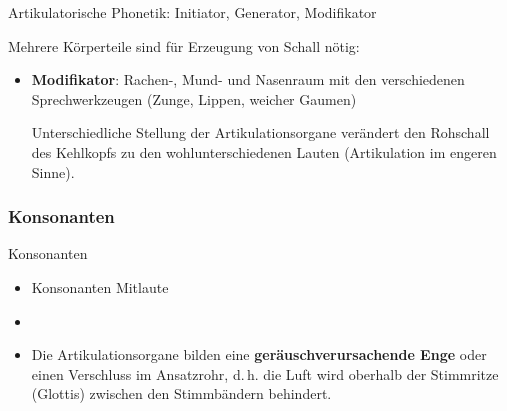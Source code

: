 
\begin{frame}{Artikulatorische Phonetik: Initiator, Generator, Modifikator}

Mehrere Körperteile sind für Erzeugung von Schall nötig:

	\begin{itemize}
		\item \textbf{Modifikator}: Rachen-, Mund- und Nasenraum mit den verschiedenen Sprechwerkzeugen (Zunge, Lippen, weicher Gaumen) \ras
		
		Unterschiedliche Stellung der Artikulationsorgane verändert den Rohschall des Kehlkopfs zu den wohlunterschiedenen Lauten (Artikulation im engeren Sinne).
	\end{itemize}
	
\end{frame}




	



%
\subsubsection{Konsonanten}

\begin{frame}{Konsonanten}

	\begin{itemize}
		\item Konsonanten \ras Mitlaute
		\item[]
		\item Die Artikulationsorgane bilden eine \textbf{geräuschverursachende Enge} oder einen Verschluss im Ansatzrohr, d.\,h. die Luft wird oberhalb der Stimmritze (Glottis) zwischen den Stimmbändern behindert.
	\end{itemize}
	
\end{frame}


